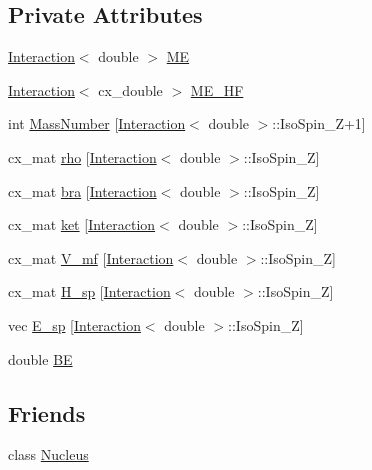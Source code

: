 \subsection*{Private Attributes}
\begin{DoxyCompactItemize}
\item 
\hyperlink{class_interaction}{Interaction}$<$ double $>$ \hyperlink{class_hartree_fock_a4a6514cfef19a943db8cb06b245b2f93}{M\-E}
\item 
\hyperlink{class_interaction}{Interaction}$<$ cx\-\_\-double $>$ \hyperlink{class_hartree_fock_abfd928be86a6d127aff8d8c928d30695}{M\-E\-\_\-\-H\-F}
\item 
int \hyperlink{class_hartree_fock_a18404222b2f400fb9c9985e0b7c7e664}{Mass\-Number} \mbox{[}\hyperlink{class_interaction}{Interaction}$<$ double $>$\-::Iso\-Spin\-\_\-\-Z+1\mbox{]}
\item 
cx\-\_\-mat \hyperlink{class_hartree_fock_a1f460784edc46e9b41d4ea047ef3a3a1}{rho} \mbox{[}\hyperlink{class_interaction}{Interaction}$<$ double $>$\-::Iso\-Spin\-\_\-\-Z\mbox{]}
\item 
cx\-\_\-mat \hyperlink{class_hartree_fock_a7e7361a6e064c9983b0e263f250dd615}{bra} \mbox{[}\hyperlink{class_interaction}{Interaction}$<$ double $>$\-::Iso\-Spin\-\_\-\-Z\mbox{]}
\item 
cx\-\_\-mat \hyperlink{class_hartree_fock_a78ba84d83058ad9c7db287beebb154d4}{ket} \mbox{[}\hyperlink{class_interaction}{Interaction}$<$ double $>$\-::Iso\-Spin\-\_\-\-Z\mbox{]}
\item 
cx\-\_\-mat \hyperlink{class_hartree_fock_a0362bdcdbf5969097be8c03576639e53}{V\-\_\-mf} \mbox{[}\hyperlink{class_interaction}{Interaction}$<$ double $>$\-::Iso\-Spin\-\_\-\-Z\mbox{]}
\item 
cx\-\_\-mat \hyperlink{class_hartree_fock_a4cd7c0aece3eec0c593638763f846d36}{H\-\_\-sp} \mbox{[}\hyperlink{class_interaction}{Interaction}$<$ double $>$\-::Iso\-Spin\-\_\-\-Z\mbox{]}
\item 
vec \hyperlink{class_hartree_fock_a1bb866f2ea89dc0d44f70e1d8e6b1425}{E\-\_\-sp} \mbox{[}\hyperlink{class_interaction}{Interaction}$<$ double $>$\-::Iso\-Spin\-\_\-\-Z\mbox{]}
\item 
double \hyperlink{class_hartree_fock_ae654600f841836c3cb98abee72bf6c35}{B\-E}
\end{DoxyCompactItemize}
\subsection*{Friends}
\begin{DoxyCompactItemize}
\item 
class \hyperlink{class_hartree_fock_a645d83d6370a8adf666416d08c846ddd}{Nucleus}
\end{DoxyCompactItemize}


